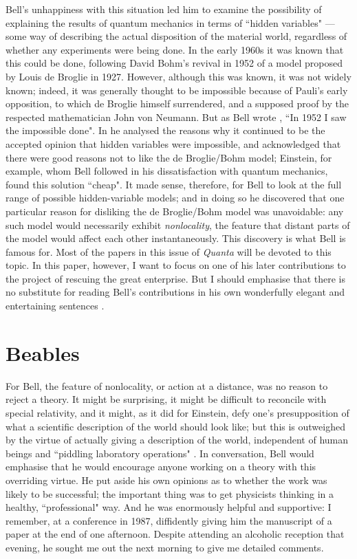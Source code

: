 \documentclass[12pt,reqno]{article}
\renewcommand{\(}{\left(}
\renewcommand{\)}{\right)}
\renewcommand{\.}{\centerdot}
\newcommand{\1}{\mathbf{1}}
\newcommand{\<}{\langle}
\renewcommand{\>}{\rangle}
\theoremstyle{definition}
\theoremstyle{remark}
\numberwithin{equation}{section}
\begin{document}
Bell's unhappiness with this situation led him to examine the possibility of explaining the results of quantum mechanics in terms of ``hidden variables" --- some way of describing the actual disposition of the material world, regardless of whether any experiments were being done. In the early 1960s it was known that this could be done, following David Bohm's revival in 1952 of a model proposed by Louis de Broglie in 1927. However, although this was known, it was not widely known; indeed, it was generally thought to be impossible because of Pauli's early opposition, to which de Broglie himself surrendered, and a supposed proof by the respected mathematician John von Neumann. But as Bell wrote \cite{Bell:pilot}, ``In 1952 I saw the impossible done". In \cite{Bell:pilot} he analysed the reasons why it continued to be the accepted opinion that hidden variables were impossible, and acknowledged that there were good reasons not to like the de Broglie/Bohm model; Einstein, for example, whom Bell followed in his dissatisfaction with quantum mechanics, found this solution ``cheap". It made sense, therefore, for Bell to look at the full range of possible hidden-variable models; and in doing so he discovered that one particular reason for disliking the de Broglie/Bohm model was unavoidable: any such model would necessarily exhibit \emph{nonlocality}, the feature that distant parts of the model would affect each other instantaneously. This discovery is what Bell is famous for. Most of the papers in this issue of \emph{Quanta} will be devoted to this topic. In this paper, however, I want to focus on one of his later contributions to the project of rescuing the great enterprise. But I should emphasise that there is no substitute for reading Bell's contributions in his own wonderfully elegant and entertaining sentences \cite{Bell:book}.

\section{Beables}

For Bell, the feature of nonlocality, or action at a distance, was no reason to reject a theory. It might be surprising, it might be difficult to reconcile with special relativity, and it might, as it did for Einstein, defy one's presupposition of what a scientific description of the world should look like; but this is outweighed by the virtue of actually giving a description of the world, independent of human beings and ``piddling laboratory operations" \cite{Bell:piddling}. In conversation, Bell would emphasise that he would encourage anyone working on a theory with this overriding virtue. He put aside his own opinions as to whether the work was likely to be successful; the important thing was to get physicists thinking in a healthy, ``professional" \cite{Bell:beables} way. And he was enormously helpful and supportive: I remember, at a conference in 1987, diffidently giving him the manuscript of a paper at the end of one afternoon. Despite attending an alcoholic reception that evening, he sought me out the next morning to give me detailed comments.
\end{document}

